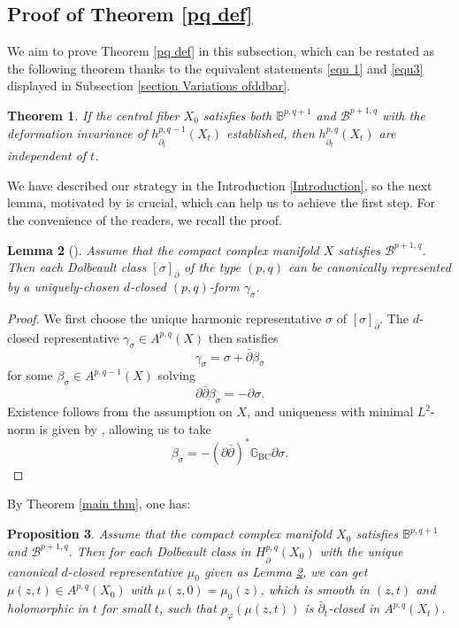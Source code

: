 \documentclass[12pt]{amsart}
\numberwithin{equation}{section}
\newtheorem{theorem} {Theorem} [section]
\newtheorem{proposition}[theorem]{Proposition}
\newtheorem{lemma}  [theorem]     {Lemma}
\theoremstyle{definition}
\theoremstyle{definition}
\theoremstyle{definition}
\renewcommand{\1}{\mathsf{1}}
\newcommand{\db}{\overline{\partial}}
\renewcommand{\>}{\rightarrow}
\def\v{\varphi}
\theoremstyle{plain} %
\theoremstyle{plain} %
\theoremstyle{plain} %
\begin{document}
	
	
	\subsection{Proof of Theorem \ref{pq def}}\label{sbs-pq}
	We aim to prove Theorem \ref{pq def} in this subsection, which can be restated as the following theorem thanks to the equivalent statements \eqref{equ 1} and \eqref{equ3} displayed  in Subsection \ref{section Variations ofddbar}.
	
	\begin{theorem}\label{inv pq'''''''}
		If the central fiber $X_0$ satisfies both
		$\mathbb{B}^{p,q+1}$ and $\mathcal{B}^{p+1,q}$ with
		the deformation invariance of $h^{p,q-1}_{\db_t}(X_t)$ established,
		then $h^{p,q}_{\db_t}(X_t)$ are independent of $t$.
	\end{theorem}
	
	We have described our strategy in the Introduction \ref{Introduction}, so the next lemma, motivated by \cite[Lemma 3.1]{Po19}  is crucial, which can help us to achieve the first step. For the convenience of the readers, we recall the proof.
	\begin{lemma}[{\cite[Lemma 3.13]{RZ18}}]\label{lemma1}
		Assume that the compact complex manifold $X$ satisfies $\mathcal{B}^{p+1,q}$. Then each Dolbeault class $[\sigma]_{\db}$ of the type $(p,q)$ can be canonically
		represented by a uniquely-chosen $d$-closed $(p,q)$-form $\gamma_{\sigma}$.
	\end{lemma}
	\begin{proof}
		We first choose the unique harmonic representative $\sigma$ of $[\sigma]_{\bar{\partial}}$. The $d$-closed representative $\gamma_{\sigma} \in A^{p,q}(X)$ then satisfies
		\[
		\gamma_{\sigma} = \sigma + \bar{\partial} \beta_{\sigma}
		\]
		for some $\beta_{\sigma} \in A^{p,q-1}(X)$ solving
		\[
		\partial \bar{\partial} \beta_{\sigma} = - \partial \sigma.
		\]
		Existence follows from the assumption on $X$, and uniqueness with minimal $L^2$-norm is given by \cite[Lemma 3.12]{RZ18}, allowing us to take
		\[
		\beta_{\sigma} = - (\partial \bar{\partial})^{*} \mathbb{G}_{\mathrm{BC}} \partial \sigma.
		\]
	\end{proof}
	By Theorem   \ref{main thm}, one has:
	\begin{proposition}\label{thmpq}
		Assume that the compact complex manifold $X_0$ satisfies $\mathbb{B}^{p,q+1}$ and $\mathcal{B}^{p+1,q}$. Then for each Dolbeault class in $H^{p,q}_{\db}(X_0)$ with the unique canonical $d$-closed representative $\mu_0$
		given as Lemma \ref{lemma1}, we can get $\mu(z,t)\in A^{p,q}(X_0)$ with $\mu(z,0)=\mu_0(z)$, which is smooth in $(z,t)$ and holomorphic in $t$  for small $t$,  such that  $\rho_\v(\mu(z,t))$
		is $\bar{\partial}_{t}$-closed in $A^{p, q}\left(X_{t}\right).$
	\end{proposition}
	
\end{document}

